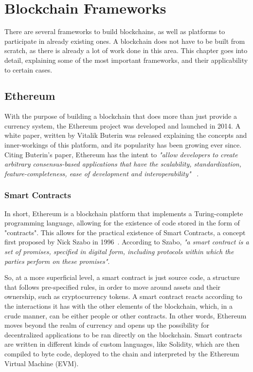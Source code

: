 \section{Blockchain Frameworks}
\label{chap:blockchain-frameworks}

\minitoc \mtcskip \noindent

There are several frameworks to build blockchains, as well as platforms to participate in already existing ones. A blockchain does not have to be built from scratch, as there is already a lot of work done in this area. This chapter goes into detail, explaining some of the most important frameworks, and their applicability to certain cases.

\subsection{Ethereum}

With the purpose of building a blockchain that does more than just provide a currency system, the Ethereum project was developed and launched in 2014. A white paper, written by Vitalik Buterin was released explaining the concepts and inner-workings of this platform, and its popularity has been growing ever since. Citing Buterin's paper, Ethereum has the intent to \textit{"allow developers to create arbitrary consensus-based applications that have the
scalability, standardization, feature-completeness, ease of development and interoperability" }~\cite{Buterin2014}.

\subsubsection{Smart Contracts}
In short, Ethereum is a blockchain platform that implements a Turing-complete programming language, allowing for the existence of code stored in the form of "contracts". This allows for the practical existence of Smart Contracts, a concept first proposed by Nick Szabo in 1996~\cite{szabo1996smart}. According to Szabo, \textit{"a smart contract is a set of promises, specified in digital form, including protocols within which the parties perform on these promises"}. 

So, at a more superficial level, a smart contract is just source code, a structure that follows pre-specified rules, in order to move around assets and their ownership, such as cryptocurrency tokens. A smart contract reacts according to the interactions it has with the other elements of the blockchain, which, in a crude manner, can be either people or other contracts. In other words, Ethereum moves beyond the realm of currency and opens up the possibility for decentralized applications to be ran directly on the blockchain. Smart contracts are written in different kinds of custom languages, like Solidity, which are then compiled to byte code, deployed to the chain and interpreted by the Ethereum Virtual Machine (EVM).

